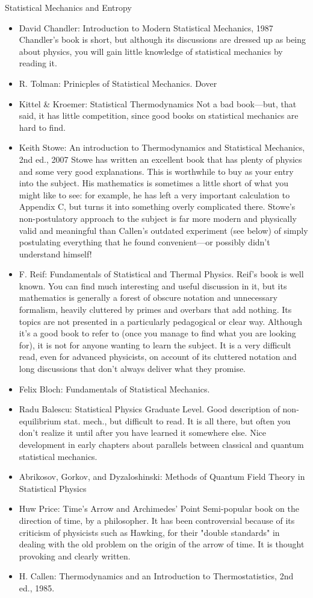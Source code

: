 \documentclass[10pt,a4paper]{book}
\theoremstyle{definition}
\begin{document}
Statistical Mechanics and Entropy

\begin{itemize}
\item David Chandler: Introduction to Modern Statistical Mechanics, 1987
Chandler's book is short, but although its discussions are dressed up as being about physics, you will gain little knowledge of statistical mechanics by reading it.
\item R. Tolman: Prinicples of Statistical Mechanics. Dover
\item Kittel \& Kroemer: Statistical Thermodynamics
Not a bad book—but, that said, it has little competition, since good books on statistical mechanics are hard to find.
\item Keith Stowe: An introduction to Thermodynamics and Statistical Mechanics, 2nd ed., 2007
Stowe has written an excellent book that has plenty of physics and some very good explanations.  This is worthwhile to buy as your entry into the subject.  His mathematics is sometimes a little short of what you might like to see: for example, he has left a very important calculation to Appendix C, but turns it into something overly complicated there.  Stowe's non-postulatory approach to the subject is far more modern and physically valid and meaningful than Callen's outdated experiment (see below) of simply postulating everything that he found convenient—or possibly didn't understand himself!
\item F. Reif: Fundamentals of Statistical and Thermal Physics.
Reif's book is well known.  You can find much interesting and useful discussion in it, but its mathematics is generally a forest of obscure notation and unnecessary formalism, heavily cluttered by primes and overbars that add nothing.  Its topics are not presented in a particularly pedagogical or clear way.  Although it's a good book to refer to (once you manage to find what you are looking for), it is not for anyone wanting to learn the subject.  It is a very difficult read, even for advanced physicists, on account of its cluttered notation and long discussions that don't always deliver what they promise.
\item Felix Bloch: Fundamentals of Statistical Mechanics.
\item Radu Balescu: Statistical Physics
Graduate Level.  Good description of non-equilibrium stat. mech., but difficult to read.  It is all there, but often you don't realize it until after you have learned it somewhere else.  Nice development in early chapters about parallels between classical and quantum statistical mechanics.
\item Abrikosov, Gorkov, and Dyzaloshinski: Methods of Quantum Field Theory in Statistical Physics
\item Huw Price: Time's Arrow and Archimedes' Point
Semi-popular book on the direction of time, by a philosopher.  It has been controversial because of its criticism of physicists such as Hawking, for their "double standards" in dealing with the old problem on the origin of the arrow of time.  It is thought provoking and clearly written.
\item H. Callen: Thermodynamics and an Introduction to Thermostatistics, 2nd ed., 1985.


\end{itemize}
\end{document}
